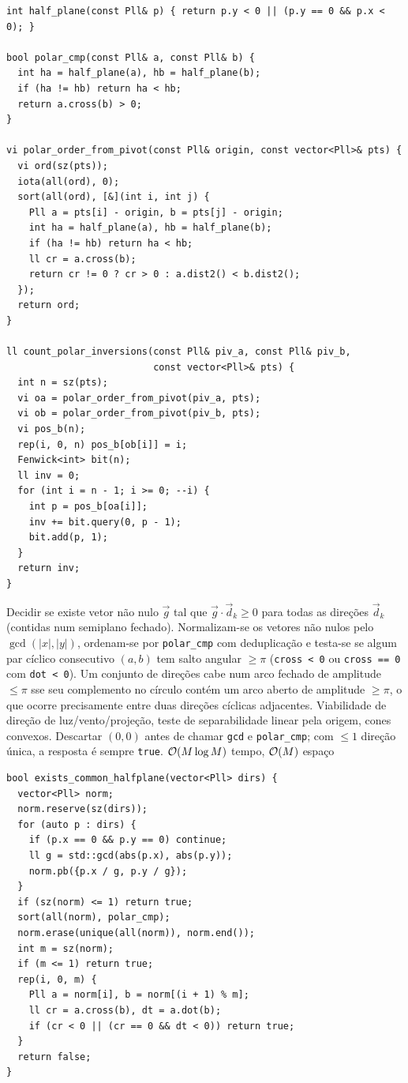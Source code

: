 \begin{lstlisting}
int half_plane(const Pll& p) { return p.y < 0 || (p.y == 0 && p.x < 0); }

bool polar_cmp(const Pll& a, const Pll& b) {
  int ha = half_plane(a), hb = half_plane(b);
  if (ha != hb) return ha < hb;
  return a.cross(b) > 0;
}

vi polar_order_from_pivot(const Pll& origin, const vector<Pll>& pts) {
  vi ord(sz(pts));
  iota(all(ord), 0);
  sort(all(ord), [&](int i, int j) {
    Pll a = pts[i] - origin, b = pts[j] - origin;
    int ha = half_plane(a), hb = half_plane(b);
    if (ha != hb) return ha < hb;
    ll cr = a.cross(b);
    return cr != 0 ? cr > 0 : a.dist2() < b.dist2();
  });
  return ord;
}

ll count_polar_inversions(const Pll& piv_a, const Pll& piv_b,
                          const vector<Pll>& pts) {
  int n = sz(pts);
  vi oa = polar_order_from_pivot(piv_a, pts);
  vi ob = polar_order_from_pivot(piv_b, pts);
  vi pos_b(n);
  rep(i, 0, n) pos_b[ob[i]] = i;
  Fenwick<int> bit(n);
  ll inv = 0;
  for (int i = n - 1; i >= 0; --i) {
    int p = pos_b[oa[i]];
    inv += bit.query(0, p - 1);
    bit.add(p, 1);
  }
  return inv;
}
\end{lstlisting}

\algobox
  {Decidir se existe vetor não nulo $\vec{g}$ tal que $\vec{g} \cdot \vec{d}_k \ge 0$ para todas as direções $\vec{d}_k$ (contidas num semiplano fechado).}
  {Normalizam-se os vetores não nulos pelo $\gcd(|x|, |y|)$, ordenam-se por \texttt{polar\_cmp} com deduplicação e testa-se se algum par cíclico consecutivo $(a, b)$ tem salto angular $\ge \pi$ (\texttt{cross < 0} ou \texttt{cross == 0} com \texttt{dot < 0}).}
  {Um conjunto de direções cabe num arco fechado de amplitude $\le \pi$ sse seu complemento no círculo contém um arco aberto de amplitude $\ge \pi$, o que ocorre precisamente entre duas direções cíclicas adjacentes.}
  {Viabilidade de direção de luz/vento/projeção, teste de separabilidade linear pela origem, cones convexos.}
  {Descartar $(0, 0)$ antes de chamar \texttt{gcd} e \texttt{polar\_cmp}; com $\le 1$ direção única, a resposta é sempre \texttt{true}.}
  {$\mathcal{O}(M \log M)$ tempo, $\mathcal{O}(M)$ espaço}

\begin{lstlisting}
bool exists_common_halfplane(vector<Pll> dirs) {
  vector<Pll> norm;
  norm.reserve(sz(dirs));
  for (auto p : dirs) {
    if (p.x == 0 && p.y == 0) continue;
    ll g = std::gcd(abs(p.x), abs(p.y));
    norm.pb({p.x / g, p.y / g});
  }
  if (sz(norm) <= 1) return true;
  sort(all(norm), polar_cmp);
  norm.erase(unique(all(norm)), norm.end());
  int m = sz(norm);
  if (m <= 1) return true;
  rep(i, 0, m) {
    Pll a = norm[i], b = norm[(i + 1) % m];
    ll cr = a.cross(b), dt = a.dot(b);
    if (cr < 0 || (cr == 0 && dt < 0)) return true;
  }
  return false;
}
\end{lstlisting}

